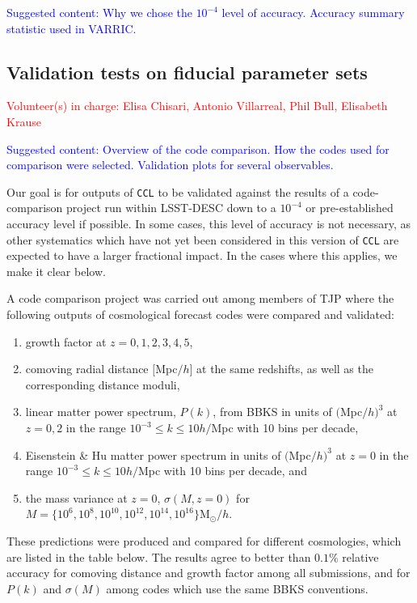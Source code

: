 \documentclass[\docopts]{\docclass}
\newcommand{\vol}[1]{\textcolor{red}{Volunteer(s) in charge: #1}}
\newcommand{\cont}[1]{\textcolor{blue}{Suggested content: #1}}
\newcommand{\ccl}{{\tt CCL}\xspace}
\begin{document}
\cont{Why we chose the $10^{-4}$ level of accuracy. Accuracy summary statistic used in VARRIC.}

\subsection{Validation tests on fiducial parameter sets}
\vol{Elisa Chisari, Antonio Villarreal, Phil Bull, Elisabeth Krause}

\cont{Overview of the code comparison. How the codes used for comparison were selected. Validation plots for several observables.}

Our goal is for outputs of \ccl to be validated against the results of a code-comparison project run within LSST-DESC down to a $10^{-4}$ or pre-established accuracy level if possible. In some cases, this level of accuracy is not necessary, as other systematics which have not yet been considered in this version of \ccl are expected to have a larger fractional impact. In the cases where this applies, we make it clear below.


A code comparison project was carried out among members of TJP where the following outputs of cosmological forecast codes were compared and validated:
\begin{enumerate}
\item growth factor at $z = 0,1,2,3,4,5$,
\item comoving radial distance $[$Mpc$/h]$ at the same redshifts, as well as the corresponding distance moduli,
\item linear matter power spectrum, $P(k)$, from BBKS \citep{BBKS} in units of $($Mpc$/h)^3$ at $z=0,2$ in the range $10^{-3} \leq k \leq 10 h/$Mpc with 10 bins per decade,
\item Eisenstein \& Hu matter power spectrum in units of $($Mpc$/h)^3$ at $z=0$ in the range $10^{-3} \leq k \leq 10 h/$Mpc with 10 bins per decade, and
\item the mass variance at $z=0$, $\sigma(M,z=0)$ for $M =\{10^6, 10^8, 10^{10}, 10^{12}, 10^{14}, 10^{16}\} $M$_\odot/h$.
\end{enumerate}
These predictions were produced and compared for different cosmologies, which are listed in the table below. The results agree to better than $0.1\%$ relative accuracy for comoving distance and growth factor among all submissions, and for $P(k)$ and $\sigma(M)$ among codes which use the same BBKS conventions.
\end{document}
